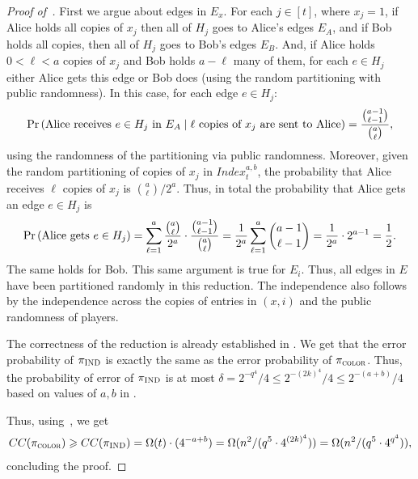\documentclass[11pt]{article}
\theoremstyle{definition}
\renewcommand{\leq}{\leqslant}
\renewcommand{\geq}{\geqslant}
\newcommand{\paren}[1]{\ensuremath{\left(#1\right)}\xspace}
\DeclareMathOperator*{\Prob}{\ensuremath{\textnormal{Pr}}}
\renewcommand{\Pr}{\Prob}
\newcommand{\prot}{\ensuremath{\pi}}
\newcommand{\protindex}{\ensuremath{\prot_{\textnormal{\textsc{IND}}}}}
\begin{document}
\begin{proof}[Proof of~]
	First we argue about edges in $E_x$. For each $j\in [t]$, where $x_j=1$, if Alice holds all copies of $x_j$ then all of $H_j$ goes to Alice's edges $E_A$, and if Bob holds all copies, then all of $H_j$ goes to Bob's edges $E_B$. 
	And, if Alice holds $0 < \ell < a$ copies of $x_j$ and Bob holds $a-\ell$ many of them, for each $e\in H_j$ either Alice gets this edge or Bob does (using the random partitioning with public randomness). 
	In this case, for each edge $e \in H_j$: 
	\[
		\Pr\paren{\text{Alice receives $e \in H_j$ in $E_A$} \mid \text{$\ell$ copies of $x_j$ are sent to Alice}} = \frac{{a-1 \choose \ell-1}}{{a \choose \ell}},
	\]
	using the randomness of the partitioning via public randomness. Moreover, given the random partitioning of copies of $x_j$ in $Index^{a,b}_t$, the probability that 
	Alice receives $\ell$ copies of $x_j$ is $\binom{a}{\ell}/2^a$.  Thus, in total the probability that Alice gets an edge $e\in H_j$ is 
	\begin{align*}
		\Pr\paren{\text{Alice gets $e \in H_j$}}
		= \sum_{\ell=1}^{a} \frac{{a \choose \ell}}{2^a}\cdot\frac{{a-1 \choose \ell-1}}{{a \choose \ell}}
		= \frac{1}{2^a} \sum_{\ell=1}^{a} {a-1 \choose \ell-1}
		=\frac{1}{2^a}\cdot 2^{a-1}=\frac{1}{2}.
	\end{align*}
	The same holds for Bob.	This same argument is true for $E_i$. Thus, all edges in $E$ have been partitioned randomly in this reduction. The independence also follows by the independence across
	the copies of entries in $(x,i)$ and the public randomness of players. 

	
	The correctness of the reduction is already established in . We get that the error probability of $\protindex$ is exactly the same as the error probability of $\pi_{\textsc{color}}$. Thus, the probability of error of $\protindex$ is at most 
	$\delta = 2^{-q^4}/4 \leq 2^{-(2k)^4}/4  \leq 2^{-(a+b)}/4$ based on values of $a, b$ in  .

	
	Thus, using~, we get 
	\begin{align*}
		CC(\protcolor) \geq CC(\protindex)= \Omega(t)\cdot (4^{-a+b}) = \Omega(n^2/(q^5 \cdot 4^{(2k)^4})) = \Omega(n^2/(q^5 \cdot 4^{q^4})),
	\end{align*}
 concluding the proof.
\end{proof}
\end{document}
